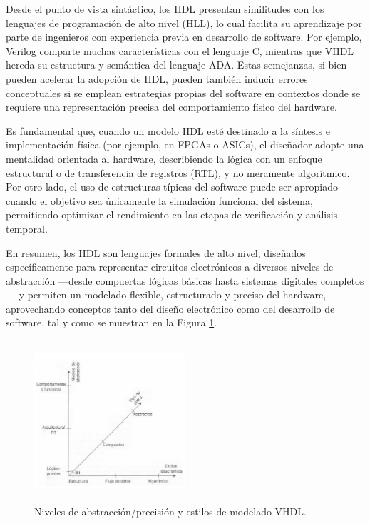 Desde el punto de vista sintáctico, los HDL presentan similitudes con los lenguajes de programación de alto nivel (HLL), lo cual facilita su aprendizaje por parte de ingenieros con experiencia previa en desarrollo de software. Por ejemplo, Verilog comparte muchas características con el lenguaje C, mientras que VHDL hereda su estructura y semántica del lenguaje ADA. Estas semejanzas, si bien pueden acelerar la adopción de HDL, pueden también inducir errores conceptuales si se emplean estrategias propias del software en contextos donde se requiere una representación precisa del comportamiento físico del hardware.

Es fundamental que, cuando un modelo HDL esté destinado a la síntesis e implementación física (por ejemplo, en FPGAs o ASICs), el diseñador adopte una mentalidad orientada al hardware, describiendo la lógica con un enfoque estructural o de transferencia de registros (RTL), y no meramente algorítmico. Por otro lado, el uso de estructuras típicas del software puede ser apropiado cuando el objetivo sea únicamente la simulación funcional del sistema, permitiendo optimizar el rendimiento en las etapas de verificación y análisis temporal.

En resumen, los HDL son lenguajes formales de alto nivel, diseñados específicamente para representar circuitos electrónicos a diversos niveles de abstracción —desde compuertas lógicas básicas hasta sistemas digitales completos— y permiten un modelado flexible, estructurado y preciso del hardware, aprovechando conceptos tanto del diseño electrónico como del desarrollo de software, tal y como se muestran en la Figura \ref{fig:imagen1}. 
\begin{figure}[h!] %
    \centering %
     \includegraphics[width=0.5\textwidth, height=6cm]{imagenes/img1} %
    \caption{Niveles de abstracción/precisión y estilos de modelado VHDL.}
    \label{fig:imagen1} %
\end{figure} 

